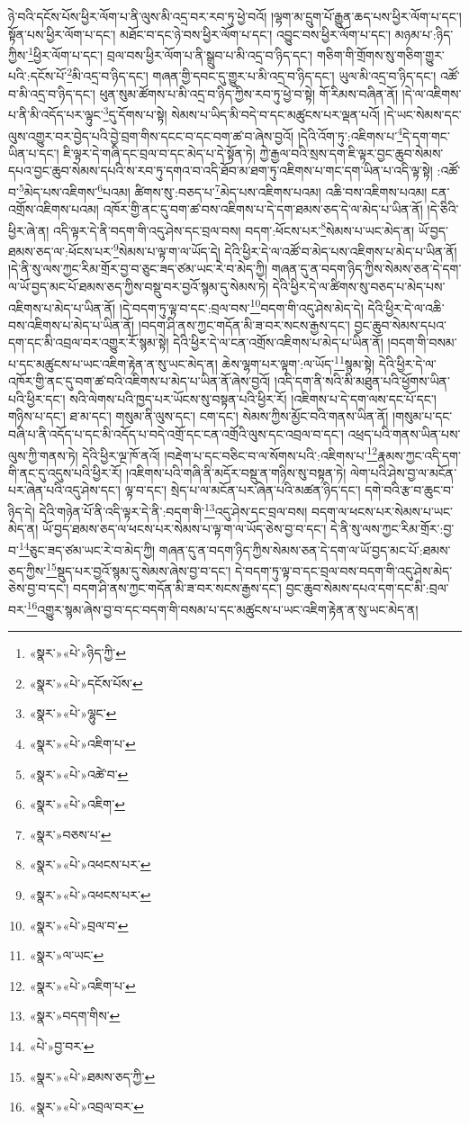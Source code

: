 ཉེ་བའི་དངོས་པོས་ཕྱིར་ལོག་པ་ནི་ལུས་མི་འདྲ་བར་རབ་ཏུ་ཕྱེ་བའོ། །ལྷག་མ་དྲུག་པོ་རྒྱུན་ཆད་པས་ཕྱིར་ལོག་པ་དང་། སྟོན་པས་ཕྱིར་ལོག་པ་དང་། མཐོང་བ་དང་ཉེ་བས་ཕྱིར་ལོག་པ་དང་། འབྱུང་བས་ཕྱིར་ལོག་པ་དང་། མཉམ་པ་:ཉིད་ཀྱིས་\footnote{«སྣར་»«པེ་»ཉིད་ཀྱི་}ཕྱིར་ལོག་པ་དང་། བྲལ་བས་ཕྱིར་ལོག་པ་ནི་སྒྲུབ་པ་མི་འདྲ་བ་ཉིད་དང་། གཅིག་གི་གྲོགས་སུ་གཅིག་གྱུར་པའི་:དངོས་པོ་\footnote{«སྣར་»«པེ་»དངོས་པོས་}མི་འདྲ་བ་ཉིད་དང་། གཞན་གྱི་དབང་དུ་གྱུར་པ་མི་འདྲ་བ་ཉིད་དང་། ཡུལ་མི་འདྲ་བ་ཉིད་དང་། འཚོ་བ་མི་འདྲ་བ་ཉིད་དང་། ཕུན་སུམ་ཚོགས་པ་མི་འདྲ་བ་ཉིད་ཀྱིས་རབ་ཏུ་ཕྱེ་བ་སྟེ། གོ་རིམས་བཞིན་ནོ། །དེ་ལ་འཇིགས་པ་ནི་མི་འདོད་པར་ལྟུང་\footnote{«སྣར་»«པེ་»ལྷུང་}དུ་དོགས་པ་སྟེ། སེམས་པ་ཡིད་མི་བདེ་བ་དང་མཚུངས་པར་ལྡན་པའོ། །དེ་ཡང་སེམས་དང་ལུས་འགྱུར་བར་བྱེད་པའི་བྱེ་བྲག་གིས་དངང་བ་དང་བག་ཚ་བ་ཞེས་བྱའོ། །དེའི་འོག་ཏུ་:འཇིགས་པ་\footnote{«སྣར་»«པེ་»འཇིག་པ་}དེ་དག་གང་ཡིན་པ་དང་། ཇི་ལྟར་དེ་གཞི་དང་བྲལ་བ་དང་མེད་པ་དེ་སྟོན་ཏེ། ཀྱེ་རྒྱལ་བའི་སྲས་དག་ཇི་ལྟར་བྱང་ཆུབ་སེམས་དཔའ་བྱང་ཆུབ་སེམས་དཔའི་ས་རབ་ཏུ་དགའ་བ་འདི་ཐོབ་མ་ཐག་ཏུ་འཇིགས་པ་གང་དག་ཡིན་པ་འདི་ལྟ་སྟེ། :འཚོ་བ་\footnote{«སྣར་»«པེ་»འཚེ་བ་}མེད་པས་འཇིགས་\footnote{«སྣར་»«པེ་»འཇིག་}པའམ། ཚིགས་སུ་:བཅད་པ་\footnote{«སྣར་»བཅས་པ་}མེད་པས་འཇིགས་པའམ། འཆི་བས་འཇིགས་པའམ། ངན་འགྲོས་འཇིགས་པའམ། འཁོར་གྱི་ནང་དུ་བག་ཚ་བས་འཇིགས་པ་དེ་དག་ཐམས་ཅད་དེ་ལ་མེད་པ་ཡིན་ནོ། །དེ་ཅིའི་ཕྱིར་ཞེ་ན། འདི་ལྟར་དེ་ནི་བདག་གི་འདུ་ཤེས་དང་བྲལ་བས། བདག་:ཕོངས་པར་\footnote{«སྣར་»«པེ་»འཕངས་པར་}སེམས་པ་ཡང་མེད་ན། ཡོ་བྱད་ཐམས་ཅད་ལ་:ཕོངས་པར་\footnote{«སྣར་»«པེ་»འཕངས་པར་}སེམས་པ་ལྟ་ག་ལ་ཡོད་དེ། དེའི་ཕྱིར་དེ་ལ་འཚོ་བ་མེད་པས་འཇིགས་པ་མེད་པ་ཡིན་ནོ། །དེ་ནི་སུ་ལས་ཀྱང་རིམ་གྲོར་བྱ་བ་ཅུང་ཟད་ཙམ་ཡང་རེ་བ་མེད་ཀྱི། གཞན་དུ་ན་བདག་ཉིད་ཀྱིས་སེམས་ཅན་དེ་དག་ལ་ཡོ་བྱད་མང་པོ་ཐམས་ཅད་ཀྱིས་བསྡུ་བར་བྱའོ་སྙམ་དུ་སེམས་ཏེ། དེའི་ཕྱིར་དེ་ལ་ཚིགས་སུ་བཅད་པ་མེད་པས་འཇིགས་པ་མེད་པ་ཡིན་ནོ། །དེ་བདག་ཏུ་ལྟ་བ་དང་:བྲལ་བས་\footnote{«སྣར་»«པེ་»བྲལ་བ་}བདག་གི་འདུ་ཤེས་མེད་དེ། དེའི་ཕྱིར་དེ་ལ་འཆི་བས་འཇིགས་པ་མེད་པ་ཡིན་ནོ། །བདག་ཤི་ནས་ཀྱང་གདོན་མི་ཟ་བར་སངས་རྒྱས་དང་། བྱང་ཆུབ་སེམས་དཔའ་དག་དང་མི་འབྲལ་བར་འགྱུར་རོ་སྙམ་སྟེ། དེའི་ཕྱིར་དེ་ལ་ངན་འགྲོས་འཇིགས་པ་མེད་པ་ཡིན་ནོ། །བདག་གི་བསམ་པ་དང་མཚུངས་པ་ཡང་འཇིག་རྟེན་ན་སུ་ཡང་མེད་ན། ཆེས་ལྷག་པར་ལྟག་:ལ་ཡོད་\footnote{«སྣར་»ལ་ཡང་}སྙམ་སྟེ། དེའི་ཕྱིར་དེ་ལ་འཁོར་གྱི་ནང་དུ་བག་ཚ་བའི་འཇིགས་པ་མེད་པ་ཡིན་ནོ་ཞེས་བྱའོ། །འདི་དག་ནི་སའི་མི་མཐུན་པའི་ཕྱོགས་ཡིན་པའི་ཕྱིར་དང་། སའི་ལེགས་པའི་ཁྱད་པར་ཡོངས་སུ་བསྟན་པའི་ཕྱིར་རོ། །འཇིགས་པ་དེ་དག་ལས་དང་པོ་དང་། གཉིས་པ་དང་། ཐ་མ་དང་། གསུམ་ནི་ལུས་དང་། ངག་དང་། སེམས་ཀྱིས་མྱོང་བའི་གནས་ཡིན་ནོ། །གསུམ་པ་དང་བཞི་པ་ནི་འདོད་པ་དང་མི་འདོད་པ་བདེ་འགྲོ་དང་ངན་འགྲོའི་ལུས་དང་འབྲལ་བ་དང་། འཕྲད་པའི་གནས་ཡིན་པས་ལུས་ཀྱི་གནས་ཏེ། དེའི་ཕྱིར་ལྔ་ཁོ་ནའོ། །བརྡེག་པ་དང་བཅིང་བ་ལ་སོགས་པའི་:འཇིགས་པ་\footnote{«སྣར་»«པེ་»འཇིག་པ་}རྣམས་ཀྱང་འདི་དག་གི་ནང་དུ་འདུས་པའི་ཕྱིར་རོ། །འཇིགས་པའི་གཞི་ནི་མདོར་བསྡུ་ན་གཉིས་སུ་བསྟན་ཏེ། ལེག་པའི་ཤེས་བྱ་ལ་མངོན་པར་ཞེན་པའི་འདུ་ཤེས་དང་། ལྟ་བ་དང་། སྲེད་པ་ལ་མངོན་པར་ཞེན་པའི་མཚན་ཉིད་དང་། དགེ་བའི་རྩ་བ་ཆུང་བ་ཉིད་དེ། དེའི་གཉེན་པོ་ནི་འདི་ལྟར་དེ་ནི་:བདག་གི་\footnote{«སྣར་»བདག་གིས་}འདུ་ཤེས་དང་བྲལ་བས། བདག་ལ་ཕངས་པར་སེམས་པ་ཡང་མེད་ན། ཡོ་བྱད་ཐམས་ཅད་ལ་ཕངས་པར་སེམས་པ་ལྟ་ག་ལ་ཡོད་ཅེས་བྱ་བ་དང་། དེ་ནི་སུ་ལས་ཀྱང་རིམ་གྲོར་:བྱ་བ་\footnote{«པེ་»བྱ་བར་}ཅུང་ཟད་ཙམ་ཡང་རེ་བ་མེད་ཀྱི། གཞན་དུ་ན་བདག་ཉིད་ཀྱིས་སེམས་ཅན་དེ་དག་ལ་ཡོ་བྱད་མང་པོ་:ཐམས་ཅད་ཀྱིས་\footnote{«སྣར་»«པེ་»ཐམས་ཅད་ཀྱི་}སྡུད་པར་བྱའོ་སྙམ་དུ་སེམས་ཞེས་བྱ་བ་དང་། དེ་བདག་ཏུ་ལྟ་བ་དང་བྲལ་བས་བདག་གི་འདུ་ཤེས་མེད་ཅེས་བྱ་བ་དང་། བདག་ཤི་ནས་ཀྱང་གདོན་མི་ཟ་བར་སངས་རྒྱས་དང་། བྱང་ཆུབ་སེམས་དཔའ་དག་དང་མི་:བྲལ་བར་\footnote{«སྣར་»«པེ་»འབྲལ་བར་}འགྱུར་སྙམ་ཞེས་བྱ་བ་དང་བདག་གི་བསམ་པ་དང་མཚུངས་པ་ཡང་འཇིག་རྟེན་ན་སུ་ཡང་མེད་ན། 